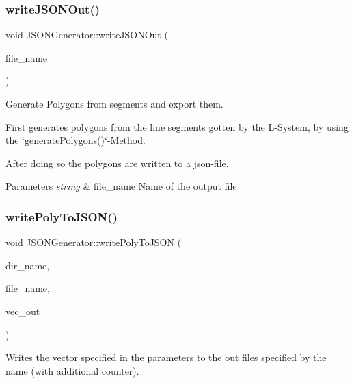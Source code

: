 \subsubsection{\texorpdfstring{write\+J\+S\+O\+N\+Out()}{writeJSONOut()}}
{\footnotesize\ttfamily void J\+S\+O\+N\+Generator\+::write\+J\+S\+O\+N\+Out (\begin{DoxyParamCaption}\item[{string}]{file\+\_\+name }\end{DoxyParamCaption})\hspace{0.3cm}{\ttfamily [static]}}



Generate Polygons from segments and export them. 

First generates polygons from the line segments gotten by the L-\/\+System, by using the \char`\"{}generate\+Polygons()\char`\"{}-\/\+Method.

After doing so the polygons are written to a json-\/file.


\begin{DoxyParams}{Parameters}
{\em string} & file\+\_\+name Name of the output file \\
\hline
\end{DoxyParams}
\hypertarget{class_j_s_o_n_generator_a25781459ecbc43c1fd555e46a8b87298}{}\label{class_j_s_o_n_generator_a25781459ecbc43c1fd555e46a8b87298} 
\subsubsection{\texorpdfstring{write\+Poly\+To\+J\+S\+O\+N()}{writePolyToJSON()}}
{\footnotesize\ttfamily void J\+S\+O\+N\+Generator\+::write\+Poly\+To\+J\+S\+ON (\begin{DoxyParamCaption}\item[{string}]{dir\+\_\+name,  }\item[{string}]{file\+\_\+name,  }\item[{std\+::vector$<$ std\+::vector$<$ Point\+\_\+2 $>$$>$}]{vec\+\_\+out }\end{DoxyParamCaption})\hspace{0.3cm}{\ttfamily [static]}}



Writes the vector specified in the parameters to the out files specified by the name (with additional counter). 

